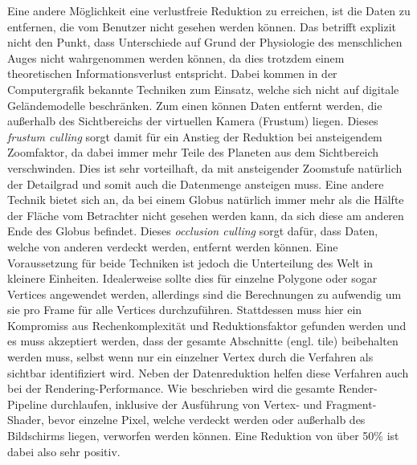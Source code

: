 Eine andere Möglichkeit eine verlustfreie Reduktion zu erreichen, ist die Daten zu entfernen, die vom Benutzer nicht gesehen werden können. Das betrifft explizit nicht den Punkt, dass Unterschiede auf Grund der Physiologie des menschlichen Auges nicht wahrgenommen werden können, da dies trotzdem einem theoretischen Informationsverlust entspricht. Dabei kommen in der Computergrafik bekannte Techniken zum Einsatz, welche sich nicht auf digitale Geländemodelle beschränken. Zum einen können Daten entfernt werden, die außerhalb des Sichtbereichs der virtuellen Kamera (Frustum) liegen. Dieses \textit{frustum culling} sorgt damit für ein Anstieg der Reduktion bei ansteigendem Zoomfaktor, da dabei immer mehr Teile des Planeten aus dem Sichtbereich verschwinden. Dies ist sehr vorteilhaft, da mit ansteigender Zoomstufe natürlich der Detailgrad und somit auch die Datenmenge ansteigen muss. Eine andere Technik bietet sich an, da bei einem Globus natürlich immer mehr als die Hälfte der Fläche vom Betrachter nicht gesehen werden kann, da sich diese am anderen Ende des Globus befindet. Dieses \textit{occlusion culling} sorgt dafür, dass Daten, welche von anderen verdeckt werden, entfernt werden können. Eine Voraussetzung für beide Techniken ist jedoch die Unterteilung des Welt in kleinere Einheiten. Idealerweise sollte dies für einzelne Polygone oder sogar Vertices angewendet werden, allerdings sind die Berechnungen zu aufwendig um sie pro Frame für alle Vertices durchzuführen. Stattdessen muss hier ein Kompromiss aus Rechenkomplexität und Reduktionsfaktor gefunden werden und es muss akzeptiert werden, dass der gesamte Abschnitte (engl. tile) beibehalten werden muss, selbst wenn nur ein einzelner Vertex durch die Verfahren als sichtbar identifiziert wird. Neben der Datenreduktion helfen diese Verfahren auch bei der Rendering-Performance. Wie beschrieben wird die gesamte Render-Pipeline durchlaufen, inklusive der Ausführung von Vertex- und Fragment-Shader, bevor einzelne Pixel, welche verdeckt werden oder außerhalb des Bildschirms liegen, verworfen werden können. Eine Reduktion von über 50\% ist dabei also sehr positiv.

